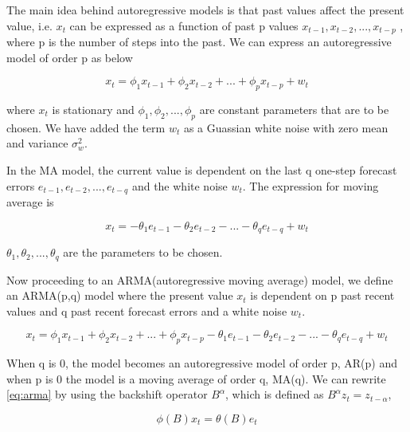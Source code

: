 The main idea behind autoregressive models is that past values affect the present value, i.e.
$x_{t}$ can be expressed as a function of past p values $ x_{t-1}, x_{t-2},...,x_{t-p} $ , where
p is the number of steps into the past. We can express an autoregressive model of order p as below

        \begin{equation} \label{eq:autoregressive}
          x_{t} = \phi_{1}x_{t-1} + \phi_{2}x_{t-2} + ... + \phi_{p}x_{t-p} + w_{t}
        \end{equation}

where $x_{t}$ is stationary and $\phi_{1}, \phi_{2},..., \phi_{p}$ are constant
parameters that are to be chosen. We have added the term $w_{t}$ as a Guassian white noise with
zero mean and variance $\sigma^{2}_{w}$.

In the MA model, the current value is dependent on the last q one-step forecast errors
$e_{t-1}, e_{t-2},...,e_{t-q}$ and the white noise $w_{t}$. The expression for moving average
is

        \begin{equation} \label{eq:movingaverage}
          x_{t} = -\theta_{1}e_{t-1} - \theta_{2}e_{t-2} - ... - \theta_{q}e_{t-q} + w_{t}
        \end{equation}

$\theta_{1}, \theta_{2},..., \theta_{q}$ are the parameters to be chosen.

Now proceeding to an ARMA(autoregressive moving average) model, we define an ARMA(p,q) model
where the present value $x_{t}$ is dependent on p past recent values and q past recent forecast
errors and a white noise $w_{t}$.

        \begin{equation} \label{eq:arma}
          x_{t} = \phi_{1}x_{t-1} + \phi_{2}x_{t-2} + ... + \phi_{p}x_{t-p} - \theta_{1}e_{t-1}
          - \theta_{2}e_{t-2} - ... - \theta_{q}e_{t-q} + w_{t}
        \end{equation}

When q is 0, the model becomes an autoregressive model of order p, AR(p) and when p is 0 the model
is a moving average of order q, MA(q). We can rewrite \ref{eq:arma} by using the backshift
operator $B^{\alpha}$, which is defined as $B^{\alpha}z_{t} = z_{t-\alpha}$,

        \begin{equation} \label{eq:armarewrite}
          \phi(B)x_{t} = \theta(B)e_{t}
        \end{equation}

